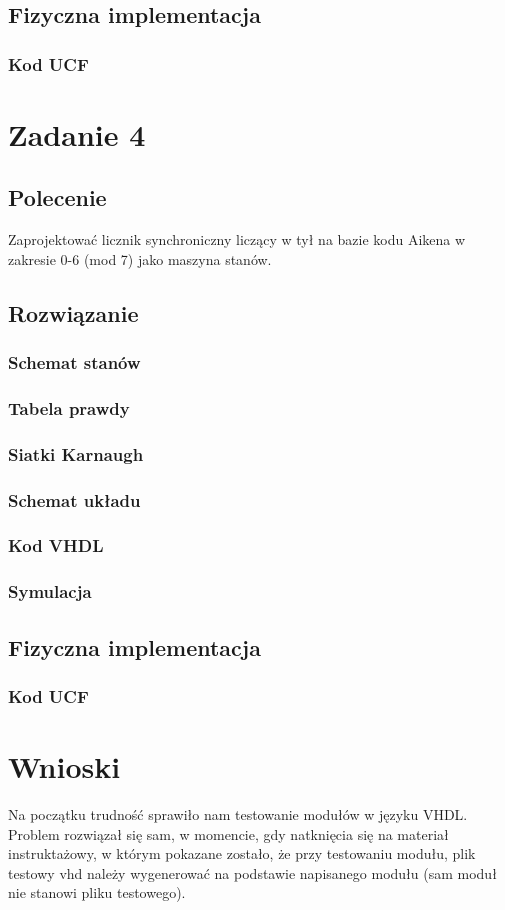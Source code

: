 \documentclass[a4paper,12pt]{extarticle}  %
\begin{document}
\subsection{Fizyczna implementacja}
\subsubsection{Kod UCF}

\section{Zadanie 4}
\subsection{Polecenie}
Zaprojektować licznik synchroniczny liczący w tył na bazie kodu Aikena w zakresie 0-6 (mod 7) jako maszyna stanów.
\subsection{Rozwiązanie}
\subsubsection{Schemat stanów}
\subsubsection{Tabela prawdy}
\subsubsection{Siatki Karnaugh}
\subsubsection{Schemat układu}
\subsubsection{Kod VHDL}
\subsubsection{Symulacja}
\subsection{Fizyczna implementacja}
\subsubsection{Kod UCF}

\section{Wnioski}

Na początku trudność sprawiło nam testowanie modułów w języku VHDL. Problem rozwiązał się sam, w momencie, gdy natknięcia się na materiał instruktażowy, w którym pokazane zostało, że przy testowaniu modułu, plik testowy vhd należy wygenerować na podstawie napisanego modułu (sam moduł nie stanowi pliku testowego).
\end{document}
